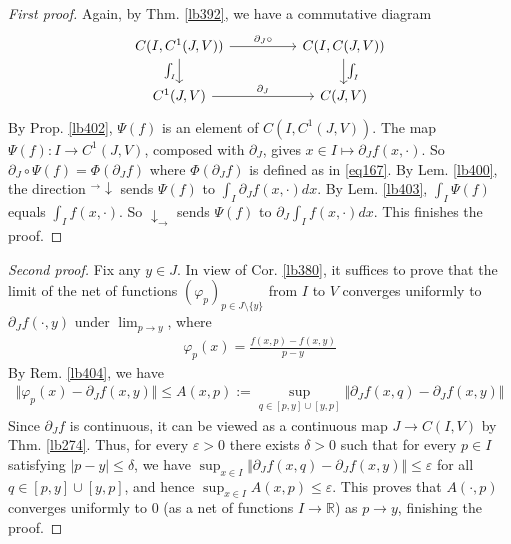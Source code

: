 \documentclass[12pt,b5paper,notitlepage]{article}
\theoremstyle{definition}
\theoremstyle{plain}
\newcommand{\Rbb}{\mathbb R}
\newcommand{\eps}{\varepsilon}
\numberwithin{equation}{section}
\begin{document}
\begin{proof}[First proof]
Again, by Thm. \ref{lb392}, we have a commutative diagram
\begin{equation*}
\begin{tikzcd}[column sep=huge]
C(I,C^1(J,V)) \arrow[r,"\partial_J\circ"] \arrow[d,"\int_I"'] & C(I,C(J,V)) \arrow[d,"\int_I"] \\
C^1(J,V) \arrow[r,"\partial_J"]           & C(J,V)         
\end{tikzcd} 
\end{equation*}
By Prop. \ref{lb402}, $\Psi(f)$ is an element of $C(I,C^1(J,V))$. The map $\Psi(f):I\rightarrow C^1(J,V)$, composed with $\partial_J$, gives $x\in I\mapsto\partial_Jf(x,\cdot)$. So $\partial_J\circ\Psi(f)=\Phi(\partial_Jf)$ where $\Phi(\partial_Jf)$ is defined as in \eqref{eq167}. By Lem. \ref{lb400}, the direction ${}^\rightarrow\!\downarrow$ sends $\Psi(f)$ to $\int_I\partial_J f(x,\cdot)dx$. By Lem. \ref{lb403}, $\int_I\Psi(f)$ equals $\int_I f(x,\cdot)$. So $\downarrow_\rightarrow$ sends $\Psi(f)$ to $\partial_J\int_I f(x,\cdot)dx$. This finishes the proof.
\end{proof}



\begin{proof}[Second proof]
Fix any $y\in J$. In view of Cor. \ref{lb380}, it suffices to prove that the limit of the net of functions $(\varphi_p)_{p\in J\setminus\{y\}}$ from $I$ to $V$ converges uniformly to $\partial_Jf(\cdot,y)$ under $\lim_{p\rightarrow y}$, where
\begin{align*}
\varphi_p(x)=\frac{f(x,p)-f(x,y)}{p-y}
\end{align*}
By Rem. \ref{lb404}, we have
\begin{align*}
\Vert \varphi_p(x)-\partial_Jf(x,y)\Vert\leq A(x,p):=\sup_{q\in[p,y]\cup[y,p]}\Vert \partial_Jf(x,q)-\partial_Jf(x,y)\Vert
\end{align*}
Since $\partial_Jf$ is continuous, it can be viewed as a continuous map $J\rightarrow C(I,V)$ by Thm. \ref{lb274}. Thus, for every $\eps>0$ there exists $\delta>0$ such that for every $p\in I$ satisfying $|p-y|\leq\delta$, we have $\sup_{x\in I}\Vert \partial_Jf(x,q)-\partial_Jf(x,y)\Vert\leq\eps$ for all $q\in[p,y]\cup[y,p]$, and hence $\sup_{x\in I}A(x,p)\leq\eps$. This proves that $A(\cdot,p)$ converges uniformly to $0$ (as a net of functions $I\rightarrow\Rbb$) as $p\rightarrow y$, finishing the proof.
\end{proof}
\end{document}
